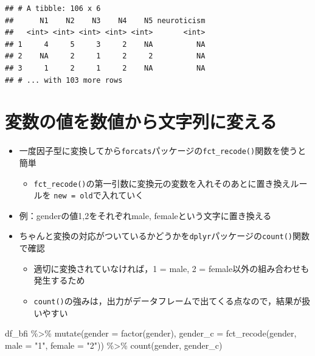 \documentclass[
  xelatex,ja=standard, b5paper]{bxjsbook}
\newenvironment{Shaded}{\begin{snugshade}}{\end{snugshade}}
\newcommand{\AttributeTok}[1]{\textcolor[rgb]{0.77,0.63,0.00}{#1}}
\newcommand{\FunctionTok}[1]{\textcolor[rgb]{0.00,0.00,0.00}{#1}}
\newcommand{\NormalTok}[1]{#1}
\newcommand{\SpecialCharTok}[1]{\textcolor[rgb]{0.00,0.00,0.00}{#1}}
\newcommand{\StringTok}[1]{\textcolor[rgb]{0.31,0.60,0.02}{#1}}
\providecommand{\tightlist}{%
  \setlength{\itemsep}{0pt}\setlength{\parskip}{0pt}}
\begin{document}
\begin{verbatim}
## # A tibble: 106 x 6
##      N1    N2    N3    N4    N5 neuroticism
##   <int> <int> <int> <int> <int>       <int>
## 1     4     5     3     2    NA          NA
## 2    NA     2     1     2     2          NA
## 3     1     2     1     2    NA          NA
## # ... with 103 more rows
\end{verbatim}

\hypertarget{ux5909ux6570ux306eux5024ux3092ux6570ux5024ux304bux3089ux6587ux5b57ux5217ux306bux5909ux3048ux308b}{%
\section{変数の値を数値から文字列に変える}\label{ux5909ux6570ux306eux5024ux3092ux6570ux5024ux304bux3089ux6587ux5b57ux5217ux306bux5909ux3048ux308b}}

\begin{itemize}
\tightlist
\item
  一度因子型に変換してから\texttt{forcats}パッケージの\texttt{fct\_recode()}関数を使うと簡単

  \begin{itemize}
  \tightlist
  \item
    \texttt{fct\_recode()}の第一引数に変換元の変数を入れそのあとに置き換えルールを \texttt{new\ =\ old}で入れていく
  \end{itemize}
\item
  例：genderの値1,2をそれぞれmale, femaleという文字に置き換える
\item
  ちゃんと変換の対応がついているかどうかを\texttt{dplyr}パッケージの\texttt{count()}関数で確認

  \begin{itemize}
  \tightlist
  \item
    適切に変換されていなければ，1 = male, 2 = female以外の組み合わせも発生するため
  \item
    \texttt{count()}の強みは，出力がデータフレームで出てくる点なので，結果が扱いやすい
  \end{itemize}
\end{itemize}

\begin{Shaded}
\begin{Highlighting}[]
\NormalTok{df\_bfi }\SpecialCharTok{\%\textgreater{}\%}
  \FunctionTok{mutate}\NormalTok{(}\AttributeTok{gender =} \FunctionTok{factor}\NormalTok{(gender),}
         \AttributeTok{gender\_c =} \FunctionTok{fct\_recode}\NormalTok{(gender, }
                               \AttributeTok{male   =} \StringTok{"1"}\NormalTok{,}
                               \AttributeTok{female =} \StringTok{"2"}\NormalTok{)) }\SpecialCharTok{\%\textgreater{}\%} 
  \FunctionTok{count}\NormalTok{(gender, gender\_c)}
\end{Highlighting}
\end{Shaded}
\end{document}
